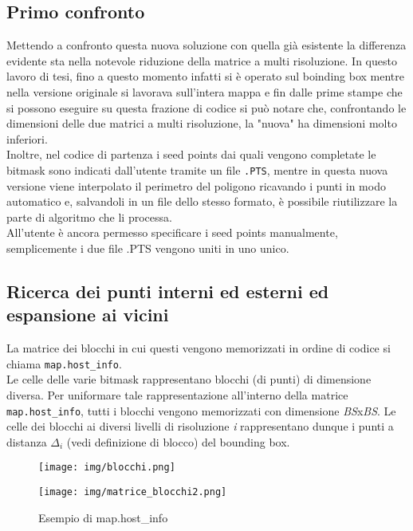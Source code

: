 		\subsection{Primo confronto}
			Mettendo a confronto questa nuova soluzione con quella gi\`{a} esistente la differenza evidente sta nella notevole riduzione della matrice a multi risoluzione. In questo lavoro di tesi, fino a questo momento infatti si \`{e} operato sul boinding box mentre nella versione originale si lavorava sull'intera mappa e fin dalle prime stampe che si possono eseguire su questa frazione di codice si pu\`{o} notare che, confrontando le dimensioni delle due matrici a multi risoluzione, la "nuova" ha dimensioni molto inferiori.\\
			Inoltre, nel codice di partenza i seed points dai quali vengono completate le bitmask sono indicati dall'utente tramite un file \texttt{.PTS}, mentre in questa nuova versione viene interpolato il perimetro del poligono ricavando i punti in modo automatico e, salvandoli in un file dello stesso formato, \`{e} possibile riutilizzare la parte di algoritmo che li processa.\\
			All'utente \`{e} ancora permesso specificare i seed points manualmente, semplicemente i due file .PTS vengono uniti in uno unico.

		\subsection{Ricerca dei punti interni ed esterni ed espansione ai vicini}
			La matrice dei blocchi in cui questi vengono memorizzati in ordine di codice si chiama \texttt{map.host\_info}.\\
			Le celle delle varie bitmask rappresentano  blocchi (di punti) di dimensione diversa. Per uniformare tale rappresentazione all'interno della matrice \texttt{map.host\_info}, tutti i blocchi vengono memorizzati con dimensione \textit{BS}x\textit{BS}. Le celle dei blocchi ai diversi livelli di risoluzione \textit{i} rappresentano dunque i punti a distanza $\Delta_i$ (vedi definizione di blocco) del bounding box.
			\begin{figure}[htbp]
				\centering
				\texttt{[image: img/blocchi.png]}
			\end{figure}
			\begin{figure}[htbp]
				\centering
				\texttt{[image: img/matrice\_blocchi2.png]}
				\caption{Esempio di map.host\_info}
			\end{figure}

